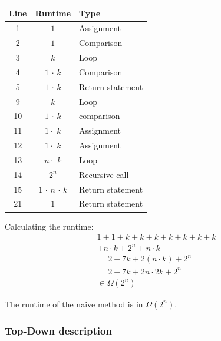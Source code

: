 \documentclass[a4paper, 11pt]{article}
\begin{document}
\begin{minipage}{0.5\textwidth}

\small{	\begin{tabular}{|c|c|l|}
		\hline
		Line & Runtime & Type \\
		\hline
		1 &  $1$ & Assignment \\
		2 &  $1$ & Comparison \\
		3 & $k$  & Loop \\
		4 & $1$ $\cdot$ $k$ & Comparison \\
		5 & $1$ $\cdot$ $k$ & Return statement\\
		9 & $k$ & Loop \\
		10 & $1$ $\cdot$ $k$ & comparison \\
		11 & $1 \cdot$ $k$ & Assignment \\
		12 & $1 \cdot$ $k$ & Assignment\\
		13 & $n \cdot$ $k$ & Loop \\
		14 & $2^n$ & Recursive call \\
		15 & $1$ $\cdot$ $n$ $\cdot$ $k$ & Return statement\\
		21 & $1$ & Return statement \\
		\hline
	\end{tabular} }
	
	
\end{minipage}\begin{minipage}{0.5\textwidth}
	Calculating the runtime:
	\vspace*{-1em}
	\begin{align*}
		& 1 + 1+ k + k +k + k + k + k + k \\
		& + n \cdot k + 2^n + n \cdot k \\
		& =  2 + 7k + 2(n \cdot k) + 2^n \\
		& = 2 + 7k + 2n \cdot 2k +  2^n \\
		& \in \Omega(2^n)
	\end{align*}
	
	The runtime of the naive method is in $\Omega(2^n)$.
	
	
\end{minipage}





\subsubsection{Top-Down description}
\label{topdowndescription}
\end{document}
